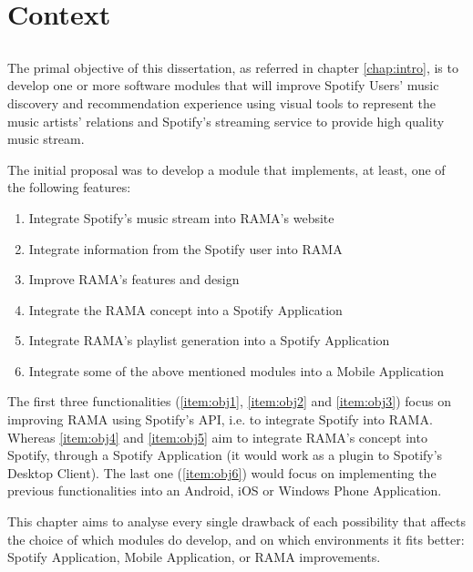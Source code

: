 
\chapter{Context}
\label{chap:chap3}

\section*{}

The primal objective of this dissertation, as referred in chapter \ref{chap:intro}, is to develop one or more software modules that will improve Spotify Users' music discovery and recommendation experience using visual tools to represent the music artists' relations and Spotify's streaming service to provide high quality music stream.


The initial proposal was to develop a module that implements, at least, one of the following features:

\begin{enumerate}
  \item \label{item:obj1} Integrate Spotify's music stream into RAMA's website
  \item \label{item:obj2} Integrate information from the Spotify user into RAMA
  \item \label{item:obj3} Improve RAMA's features and design
  \item \label{item:obj4} Integrate the RAMA concept into a Spotify Application
  \item \label{item:obj5} Integrate RAMA's playlist generation into a Spotify Application
  \item \label{item:obj6} Integrate some of the above mentioned modules into a Mobile Application
\end{enumerate}

The first three functionalities (\ref{item:obj1}, \ref{item:obj2} and \ref{item:obj3}) focus on improving RAMA using Spotify's API, i.e. to integrate Spotify into RAMA.
Whereas \ref{item:obj4} and \ref{item:obj5} aim to integrate RAMA's concept into Spotify, through a Spotify Application (it would work as a plugin to Spotify's Desktop Client).
The last one (\ref{item:obj6}) would focus on implementing the previous functionalities into an Android, iOS or Windows Phone Application.

This chapter aims to analyse every single drawback of each possibility that affects the choice of which modules do develop, and on which environments it fits better: Spotify Application, Mobile Application, or RAMA improvements.

